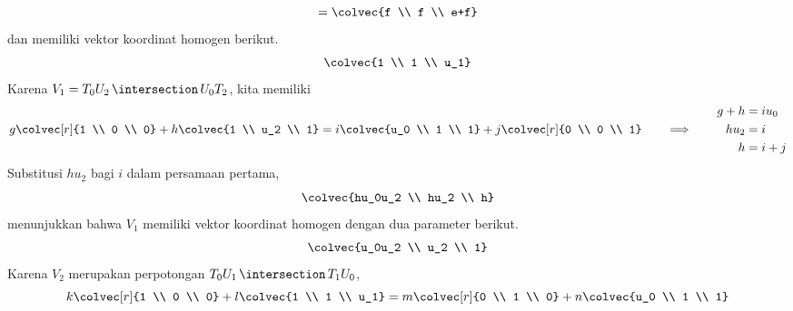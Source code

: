 \begin{exercises}
\begin{answer}
\begin{exparts}
\begin{equation*}
                              =\colvec{f \\ f \\ e+f}  
          \end{equation*}
          dan memiliki vektor koordinat homogen berikut.
          \begin{equation*}
            \colvec{1 \\ 1 \\ u_1}
          \end{equation*}
        \partsitem
          Karena $V_1=T_0U_2\,\intersection\,U_0T_2$, kita memiliki
          \begin{equation*}
            g\colvec[r]{1 \\ 0 \\ 0}+h\colvec{1 \\ u_2 \\ 1}
            =i\colvec{u_0 \\ 1 \\ 1}+j\colvec[r]{0 \\ 0 \\ 1}
            \qquad\Longrightarrow\qquad
            \begin{aligned}
              g+h  &= iu_0 \\
              hu_2 &= i    \\
              h    &= i+j
            \end{aligned}
          \end{equation*}
          Substitusi $hu_2$ bagi $i$ dalam persamaan pertama,
          \begin{equation*}
            \colvec{hu_0u_2 \\ hu_2 \\ h}
          \end{equation*}
           menunjukkan bahwa $V_1$ memiliki vektor koordinat homogen dengan
           dua parameter berikut.
          \begin{equation*}
            \colvec{u_0u_2 \\ u_2 \\ 1}
          \end{equation*}
        \partsitem
           Karena $V_2$ merupakan perpotongan
           $T_0U_1\,\intersection\,T_1U_0$,
           \begin{equation*}
             k\colvec[r]{1 \\ 0 \\ 0}+l\colvec{1 \\ 1 \\ u_1}
              =m\colvec[r]{0 \\ 1 \\ 0}+n\colvec{u_0 \\ 1 \\ 1}

\end{equation*}
\end{exparts}
\end{answer}
\end{exercises}
